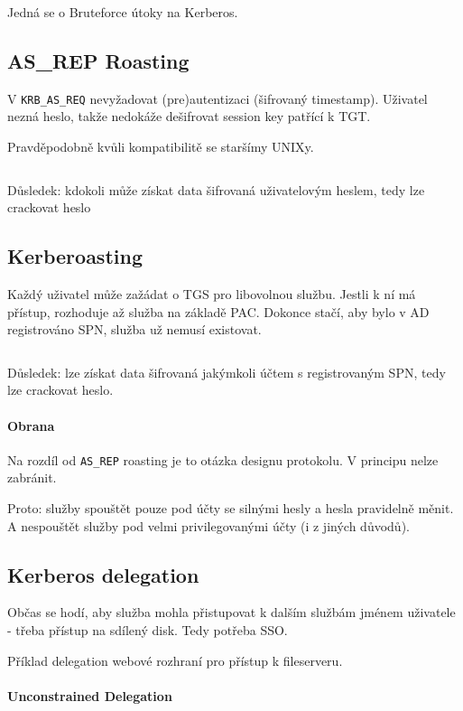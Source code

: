 \documentclass[10pt,a4paper]{article}
\begin{document}
Jedná se o Bruteforce útoky na Kerberos.


\subsection{AS\_REP Roasting}

V \texttt{KRB\_AS\_REQ} nevyžadovat (pre)autentizaci (šifrovaný timestamp).
Uživatel nezná heslo, takže nedokáže dešifrovat session key patřící k TGT.

Pravděpodobně kvůli kompatibilitě se staršímy UNIXy.

$ $

Důsledek: kdokoli může získat data šifrovaná uživatelovým heslem, tedy lze crackovat heslo


\subsection{Kerberoasting}

Každý uživatel může zažádat o TGS pro libovolnou službu.
Jestli k ní má přístup, rozhoduje až služba na základě PAC.
Dokonce stačí, aby bylo v AD registrováno SPN, služba už nemusí existovat.

$ $

Důsledek: lze získat data šifrovaná jakýmkoli účtem s registrovaným SPN, tedy lze crackovat heslo.

\paragraph{Obrana}

Na rozdíl od \texttt{AS\_REP} roasting je to otázka designu protokolu. V principu nelze zabránit.

Proto: služby spouštět pouze pod účty se silnými hesly a hesla pravidelně měnit.
A nespouštět služby pod velmi privilegovanými účty (i z jiných důvodů).


\subsection{Kerberos delegation}

Občas se hodí, aby služba mohla přistupovat k dalším službám jménem uživatele - třeba přístup na sdílený disk. Tedy potřeba SSO.

Příklad delegation webové rozhraní pro přístup k fileserveru.



\paragraph{Unconstrained Delegation}
\end{document}
